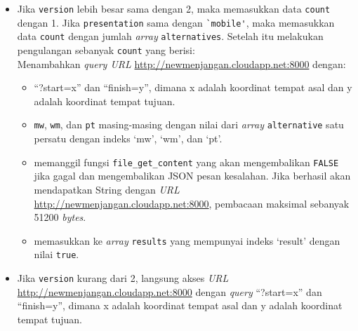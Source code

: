 \begin{itemize}
	\item Jika \verb!version! lebih besar sama dengan 2, maka memasukkan data \verb!count! dengan 1. Jika \verb!presentation! sama dengan \verb!`mobile'!, maka memasukkan data \verb!count! dengan jumlah \textit{array} \verb!alternatives!. Setelah itu melakukan pengulangan sebanyak \verb!count! yang berisi:\\
		Menambahkan \textit{query URL} \url{http://newmenjangan.cloudapp.net:8000} dengan:
		\begin{itemize}
			\item 	``?start=x'' dan ``finish=y'', dimana x adalah koordinat tempat asal dan y adalah koordinat tempat tujuan.
			\item \verb!mw!, \verb!wm!, dan \verb!pt! masing-masing dengan nilai dari \textit{array} \verb!alternative! satu persatu dengan indeks `mw', `wm', dan `pt'.
			\item memanggil fungsi \verb!file_get_content! yang akan mengembalikan \verb!FALSE! jika gagal dan mengembalikan JSON pesan kesalahan. Jika berhasil akan mendapatkan String dengan \textit{URL} \url{http://newmenjangan.cloudapp.net:8000}, pembacaan maksimal sebanyak 51200 \textit{bytes}.
			\item memasukkan ke \textit{array} \verb!results! yang mempunyai indeks `result' dengan nilai \verb!true!.
		\end{itemize}
	\item Jika \verb!version! kurang dari 2, langsung akses \textit{URL} \url{http://newmenjangan.cloudapp.net:8000} dengan \textit{query} ``?start=x'' dan ``finish=y'', dimana x adalah koordinat tempat asal dan y adalah koordinat tempat tujuan.
\end{itemize}

